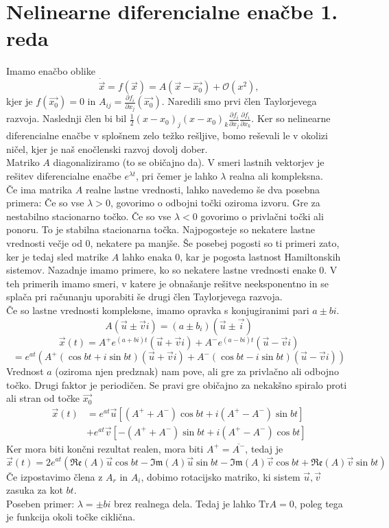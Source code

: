 \documentclass[a4paper]{article}
\newcommand{\vct}[1]{\overrightarrow{#1}}
\newcommand{\pd}[2]{\frac{\partial {#1}}{\partial {#2}}}
\begin{document}
\section{Nelinearne diferencialne enačbe 1. reda}
Imamo enačbo oblike
$$\dot{\vct{x}} = f(\vct{x}) = A(\vct{x} - \vct{x_0}) + \mathcal{O}(x^2),$$
kjer je $f(\vct{x_0}) = 0$ in $\displaystyle{A_{ij} = \pd{f_i}{x_j}(\vct{x_0})}$. Naredili smo prvi člen Taylorjevega razvoja.
Naslednji člen bi bil $\displaystyle{\frac{1}{2}(x-x_0)_j(x-x_0)_k\pd{f_i}{x_j}\pd{f_i}{x_k}}$.
Ker so nelinearne diferencialne enačbe v splošnem zelo težko rešljive, bomo reševali le v okolizi ničel, kjer je naš enočlenski razvoj dovolj dober. \\

Matriko $A$ diagonaliziramo (to se običajno da). V smeri lastnih vektorjev je rešitev diferencialne enačbe $e^{\lambda t}$, pri čemer je lahko $\lambda$ realna ali kompleksna. \\
Če ima matrika $A$ realne lastne vrednosti, lahko navedemo še dva posebna primera: Če so vse $\lambda > 0$, govorimo o odbojni točki oziroma izvoru. Gre za nestabilno stacionarno točko. Če so vse $\lambda < 0$ govorimo o privlačni točki ali ponoru. To je stabilna stacionarna točka.
Najpogosteje so nekatere lastne vrednosti večje od 0, nekatere pa manjše. Še posebej pogosti so ti primeri zato, ker je tedaj sled matrike $A$ lahko enaka 0, kar je pogosta lastnost Hamiltonskih sistemov.
Nazadnje imamo primere, ko so nekatere lastne vrednosti enake 0. V teh primerih imamo smeri, v katere je obnašanje rešitve neeksponentno in se splača pri računanju uporabiti še drugi člen Taylorjevega razvoja. \\[3mm]
Če so lastne vrednosti kompleksne, imamo opravka s konjugiranimi pari $a \pm bi$.
$$A(\vct{u} \pm \vct{v}i) = (a \pm b_i)(\vct{u} \pm \vct{i})$$
$$\vct{x}(t) = A^+ e^{(a + bi) t}(\vct{u} + \vct{v}i) + A^- e^{(a - bi) t}(\vct{u} - \vct{v}i)$$
$$= e^{at}\left(A^+ (\cos bt + i\sin bt)(\vct{u} + \vct{v}i) + A^- (\cos bt - i\sin bt) (\vct{u} - \vct{v}i)\right)$$
Vrednost $a$ (oziroma njen predznak) nam pove, ali gre za privlačno ali odbojno točko. Drugi faktor je periodičen. Se pravi gre običajno za nekakšno spiralo proti ali stran od točke $\vct{x_0}$
\begin{align*}
    \vct{x}(t) & = e^{at} \vct{u} \left[(A^+ + A^-) \cos bt + i(A^+ - A^-)\sin bt\right] \\
    & + e^{at} \vct{v} \left[-(A^+ + A^-)\sin bt + i(A^+ - A^-)\cos bt\right]
\end{align*}
Ker mora biti končni rezultat realen, mora biti $A^+ = \overline{A^-}$, tedaj je
$$\vct{x}(t) = 2e^{at}\left(\mathfrak{Re}(A) \vct{u} \cos bt - \mathfrak{Im}(A) \vct{u} \sin bt - \mathfrak{Im}(A) \vct{v} \cos bt + \mathfrak{Re}(A) \vct{v} \sin bt\right)$$
Če izpostavimo člena z $A_r$ in $A_i$, dobimo rotacijsko matriko, ki sistem $\vct{u}, \vct{v}$ zasuka za kot $bt$. \\[3mm]
Poseben primer: $\lambda = \pm bi$ brez realnega dela. Tedaj je lahko $\mathrm{Tr}A = 0$, poleg tega je funkcija okoli točke ciklična.
\end{document}
